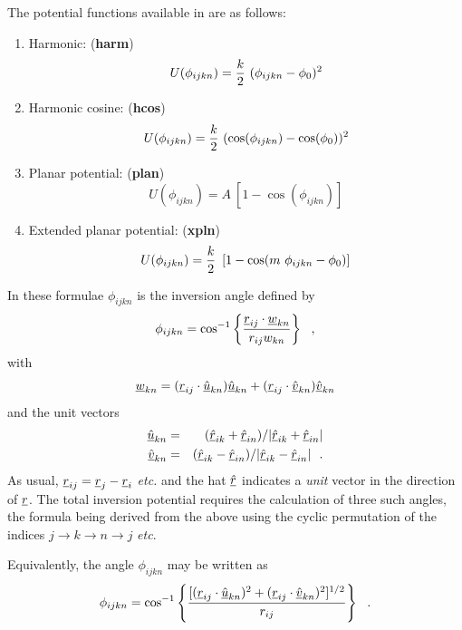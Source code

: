 The potential functions available in \D are as follows:
\begin{enumerate}
\item Harmonic:  ({\bf harm})
\begin{equation}
U(\phi_{ijkn}) = {k \over 2}~(\phi_{ijkn} - \phi_{0})^{2}
\end{equation}
\item Harmonic cosine:  ({\bf hcos})
\begin{equation}
U(\phi_{ijkn}) = {k \over 2}~(\cos(\phi_{ijkn}) - \cos(\phi_{0}))^{2}
\end{equation}
\item Planar potential:  ({\bf plan})
\begin{equation}
U(\phi_{ijkn}) = A~\left[ 1 - \cos(\phi_{ijkn}) \right]
\end{equation}
\item Extended planar potential:  ({\bf xpln})
\begin{equation}
U(\phi_{ijkn}) = {k \over 2}~\left[ 1 - \cos(m~\phi_{ijkn} - \phi_{0}) \right]
\end{equation}
\end{enumerate}
In these formulae $\phi_{ijkn}$ is the
inversion angle defined by
\begin{equation}
\phi_{ijkn}=\cos^{-1} \left\{ \frac{\mbox{$\underline{r}$}_{ij}\cdot\mbox{$\underline{w}$}_{kn}}{r_{ij}w_{kn}} \right\}~~,
\end{equation}
with
\begin{equation}
\mbox{$\underline{w}$}_{kn}=(\mbox{$\underline{r}$}_{ij}\cdot\mbox{$\underline{\hat{u}}$}_{kn})\mbox{$\underline{\hat{u}}$}_{kn}+
(\mbox{$\underline{r}$}_{ij}\cdot\mbox{$\underline{\hat{v}}$}_{kn})\mbox{$\underline{\hat{v}}$}_{kn}
\end{equation}
and the unit vectors
\begin{eqnarray}
\mbox{$\underline{\hat{u}}$}_{kn}&=&(\mbox{$\underline{\hat{r}}$}_{ik}+\mbox{$\underline{\hat{r}}$}_{in})/
|\mbox{$\underline{\hat{r}}$}_{ik}+\mbox{$\underline{\hat{r}}$}_{in}| \nonumber  \\
\mbox{$\underline{\hat{v}}$}_{kn}&=&(\mbox{$\underline{\hat{r}}$}_{ik}-\mbox{$\underline{\hat{r}}$}_{in})/
|\mbox{$\underline{\hat{r}}$}_{ik}-\mbox{$\underline{\hat{r}}$}_{in}|~~.
\end{eqnarray}
As usual, $\mbox{$\underline{r}$}_{ij}=\mbox{$\underline{r}$}_{j}-\mbox{$\underline{r}$}_{i}$ {\em etc.} and
the hat $\mbox{$\underline{\hat{r}}$}$ indicates a {\em unit} vector in the
direction of $\mbox{$\underline{r}$}$.  The total
inversion potential requires the
calculation of three such angles, the formula being derived from
the above using the cyclic permutation of the indices $j
\rightarrow k \rightarrow n \rightarrow j$ {\em etc}.

Equivalently, the angle $\phi_{ijkn}$ may be written as
\begin{equation}
\phi_{ijkn} = \cos^{-1} \left\{ \frac{ [
(\mbox{$\underline{r}$}_{ij}\cdot\mbox{$\underline{\hat{u}}$}_{kn})^{2} +
(\mbox{$\underline{r}$}_{ij}\cdot\mbox{$\underline{\hat{v}}$}_{kn})^{2}
]^{1/2}}{r_{ij}} \right\}~~.
\end{equation}

